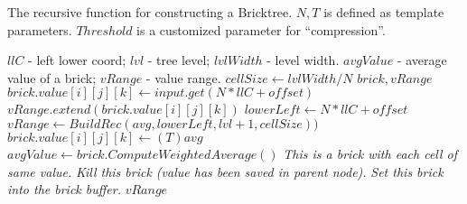 \begin{algorithm}
	\caption{The recursive function for constructing a Bricktree. $N,T$ is defined as template parameters. $Threshold$ is a customized parameter for ``compression''.}\label{alg:bricktree}
	\begin{algorithmic}[1]
	    \Require $llC$ - left lower coord; $lvl$ - tree level; $lvlWidth$ - level width.
        \Ensure $avgValue$ - average value of a brick; $vRange$ - value range.
			\State $cellSize \gets lvlWidth / N $
			\State $brick, vRange$
				\State $brick.value[i][j][k] \gets input.get(N * llC + offset)$
				\State $vRange.extend(brick.value[i][j][k])$
			\Else
			    \State $lowerLeft \gets N*llC + offset$
				\State $vRange \gets BuildRec(avg,lowerLeft, lvl+1,cellSize))$
				\State $brick.value[i][j][k] \gets (T)avg$
			\EndIf
			\State $avgValue \gets brick.ComputeWeightedAverage()$
				\State \textit{This is a brick with each cell of same value.}
				\State \textit{Kill this brick (value has been saved in parent node).}
			\Else
				\State \textit{Set this brick into the brick buffer.}
			\EndIf
			\Return $vRange$
    	\EndFunction
	\end{algorithmic}
\end{algorithm}





